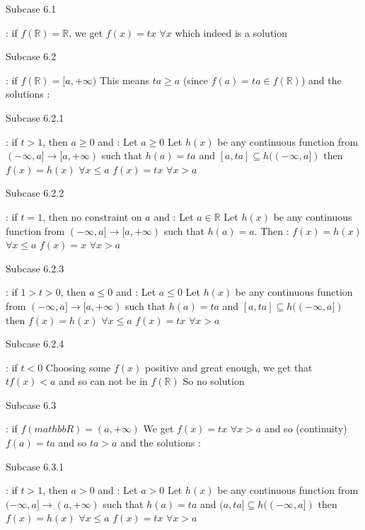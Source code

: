 \begin{solution}
\begin{bolded}Subcase 6.1\end{bolded} : if $f(\mathbb R)=\mathbb R$, we get $f(x)=tx$ $\forall x$ which indeed is a solution

\begin{bolded}Subcase 6.2\end{bolded} : if $f(\mathbb R)=[a,+\infty)$ 
This means $ta\ge a$ (since $f(a)=ta\in f(\mathbb R)$) and the solutions :

\begin{bolded}Subcase 6.2.1\end{bolded} : if $t>1$, then $a\ge 0$ and :
Let $a\ge 0$
Let $h(x)$ be any continuous function from $(-\infty,a]\to[a,+\infty)$ such that $h(a)=ta$ and $[a,ta]\subseteq h((-\infty,a])$ then 
$f(x)=h(x)$ $\forall x\le a$
$f(x)=tx$ $\forall x>a$

\begin{bolded}Subcase 6.2.2\end{bolded} : if $t=1$, then no constraint on $a$ and :
Let $a \in\mathbb R$
Let $h(x)$ be any continuous function from $(-\infty,a]\to[a,+\infty)$ such that $h(a)=a$. Then :
$f(x)=h(x)$ $\forall x\le a$
$f(x)=x$ $\forall x>a$

\begin{bolded}Subcase 6.2.3\end{bolded} : if $1>t>0$, then $a\le 0$ and :
Let $a\le 0$
Let $h(x)$ be any continuous function from $(-\infty,a]\to[a,+\infty)$ such that $h(a)=ta$ and $[a,ta]\subseteq h((-\infty,a])$ then 
$f(x)=h(x)$ $\forall x\le a$
$f(x)=tx$ $\forall x>a$

\begin{bolded}Subcase 6.2.4\end{bolded} : if $t<0$
Choosing some $f(x)$ positive and great enough, we get that $tf(x)<a$ and so can not be in $f(\mathbb R)$
So no solution

\begin{bolded}Subcase 6.3\end{bolded} : if $f(mathbb R)=(a,+\infty)$
We get $f(x)=tx$ $\forall x>a$ and so (continuity) $f(a)=ta$ and so $ta>a$ and the solutions :

\begin{bolded}Subcase 6.3.1\end{bolded} : if $t>1$, then $a>0$ and :
Let $a>0$
Let $h(x)$ be any continuous function from $(-\infty,a]\to(a,+\infty)$ such that $h(a)=ta$ and $(a,ta]\subseteq h((-\infty,a])$ then 
$f(x)=h(x)$ $\forall x\le a$
$f(x)=tx$ $\forall x>a$


\end{solution}
